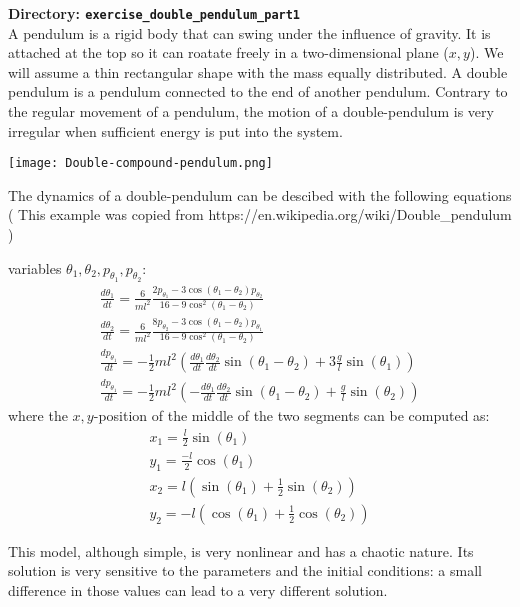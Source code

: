 {\bf Directory: {\tt exercise\_double\_pendulum\_part1}}\\

A pendulum is a rigid body that can swing under the influence of gravity. It is attached at the top so it can roatate freely in a two-dimensional plane ($x,y$).
We will assume a thin rectangular shape with the mass equally distributed. A double pendulum is a pendulum connected to the end of another pendulum. Contrary to the 
regular movement of a pendulum, the motion of a double-pendulum is very irregular when sufficient energy is put into the system. 

\begin{center}
    \texttt{[image: Double-compound-pendulum.png]}
\end{center}

The dynamics of a double-pendulum can be descibed with the following equations 
( This example was copied from https://en.wikipedia.org/wiki/Double\_pendulum )

variables $\theta_1, \theta_2, p_{\theta_1}, p_{\theta_2}$:
\begin{eqnarray}
   \frac{d \theta_1}{dt}= \frac{6}{m l^2} \frac{2 p_{\theta_1} - 3\cos(\theta_1-\theta_2) p_{\theta_2}}
   {16-9 \cos^2(\theta_1-\theta_2)}\\
   \frac{d \theta_2}{dt}= \frac{6}{m l^2} \frac{8 p_{\theta_2} - 3\cos(\theta_1-\theta_2) p_{\theta_1}}
   {16-9 \cos^2(\theta_1-\theta_2)}\\
   \frac{dp_{\theta_1}}{dt} = -\frac{1}{2} ml^2 \left( \frac{d \theta_1}{dt} \frac{d \theta_2}{dt} \sin(\theta_1-\theta_2) + 3\frac{g}{l} \sin(\theta_1) \right)  \\
   \frac{dp_{\theta_1}}{dt} = -\frac{1}{2} ml^2 \left( -\frac{d \theta_1}{dt} \frac{d \theta_2}{dt} \sin(\theta_1-\theta_2) + \frac{g}{l} \sin(\theta_2) \right) 
\end{eqnarray}
where the $x,y$-position of the middle of the two segments can be computed as:
\begin{eqnarray}
   x_1 = \frac{l}{2} \sin(\theta_1) \\
   y_1 = \frac{-l}{2} \cos(\theta_1) \\
   x_2 = l ( \sin(\theta_1) + \frac{1}{2} \sin(\theta_2) ) \\
   y_2 = -l ( \cos(\theta_1) + \frac{1}{2} \cos(\theta_2) )
\end{eqnarray}

This model, although simple, is very nonlinear and has a chaotic nature.  Its
solution is very sensitive to the parameters and the initial conditions: a
small difference in those values can lead to a very different solution.

